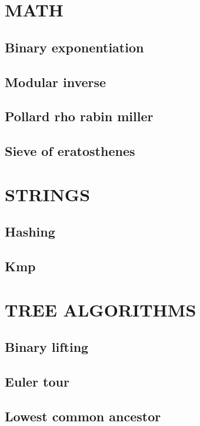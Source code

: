 \documentclass[10pt]{article}
\begin{document}
\section{MATH}
\subsection{\texorpdfstring{Binary exponentiation}{Binary exponentiation}}

\subsection{\texorpdfstring{Modular inverse}{Modular inverse}}

\subsection{\texorpdfstring{Pollard rho rabin miller}{Pollard rho rabin miller}}

\subsection{\texorpdfstring{Sieve of eratosthenes}{Sieve of eratosthenes}}


\section{STRINGS}
\subsection{\texorpdfstring{Hashing}{Hashing}}

\subsection{\texorpdfstring{Kmp}{Kmp}}


\section{TREE ALGORITHMS}
\subsection{\texorpdfstring{Binary lifting}{Binary lifting}}

\subsection{\texorpdfstring{Euler tour}{Euler tour}}

\subsection{\texorpdfstring{Lowest common ancestor}{Lowest common ancestor}}

\end{document}
